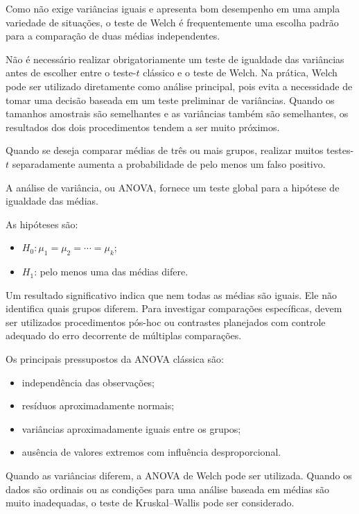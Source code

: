 Como não exige variâncias iguais e apresenta bom desempenho em uma ampla
variedade de situações, o teste de Welch é frequentemente uma escolha padrão
para a comparação de duas médias independentes.

\begin{deepdive}[]
Não é necessário realizar obrigatoriamente um teste de igualdade das variâncias
antes de escolher entre o teste-$t$ clássico e o teste de Welch. Na prática, Welch pode ser utilizado diretamente como análise principal, pois
evita a necessidade de tomar uma decisão baseada em um teste preliminar de
variâncias. Quando os tamanhos amostrais são semelhantes e as variâncias também são
semelhantes, os resultados dos dois procedimentos tendem a ser muito próximos.
\end{deepdive}

\begin{deepdive}
Quando se deseja comparar médias de três ou mais grupos, realizar muitos
testes-$t$ separadamente aumenta a probabilidade de pelo menos um falso
positivo.

A análise de variância, ou ANOVA, fornece um teste global para a hipótese de
igualdade das médias.

As hipóteses são:

\begin{itemize}
    \item $H_0:\mu_1=\mu_2=\cdots=\mu_k$;
    \item $H_1$: pelo menos uma das médias difere.
\end{itemize}

Um resultado significativo indica que nem todas as médias são iguais. Ele não
identifica quais grupos diferem. Para investigar comparações específicas, devem ser utilizados procedimentos
pós-hoc ou contrastes planejados com controle adequado do erro decorrente de
múltiplas comparações.

Os principais pressupostos da ANOVA clássica são:

\begin{itemize}
    \item independência das observações;
    \item resíduos aproximadamente normais;
    \item variâncias aproximadamente iguais entre os grupos;
    \item ausência de valores extremos com influência desproporcional.
\end{itemize}

Quando as variâncias diferem, a ANOVA de Welch pode ser utilizada. Quando os dados são ordinais ou as condições para uma análise baseada em médias são muito inadequadas, o teste de Kruskal--Wallis pode ser considerado.
\end{deepdive}

